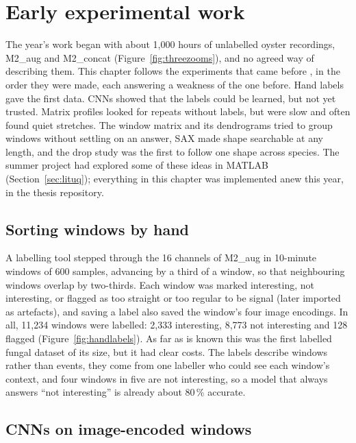\chapter{Early experimental work}
\label{ch:early}

The year's work began with about 1,000 hours of unlabelled oyster recordings, M2\_aug and M2\_concat (Figure~\ref{fig:threezooms}), and no agreed way of describing them. This chapter follows the experiments that came before \tool{}, in the order they were made, each answering a weakness of the one before. Hand labels gave the first data. CNNs showed that the labels could be learned, but not yet trusted. Matrix profiles looked for repeats without labels, but were slow and often found quiet stretches. The window matrix and its dendrograms tried to group windows without settling on an answer, SAX made shape searchable at any length, and the drop study was the first to follow one shape across species. The summer project had explored some of these ideas in MATLAB (Section~\ref{sec:lituq}); everything in this chapter was implemented anew this year, in the thesis repository.

\section{Sorting windows by hand}
\label{sec:handlabels}

A labelling tool stepped through the 16 channels of M2\_aug in 10-minute windows of 600 samples, advancing by a third of a window, so that neighbouring windows overlap by two-thirds. Each window was marked interesting, not interesting, or flagged as too straight or too regular to be signal (later imported as artefacts), and saving a label also saved the window's four image encodings. In all, 11,234 windows were labelled: 2,333 interesting, 8,773 not interesting and 128 flagged (Figure~\ref{fig:handlabels}). As far as is known this was the first labelled fungal dataset of its size, but it had clear costs. The labels describe windows rather than events, they come from one labeller who could see each window's context, and four windows in five are not interesting, so a model that always answers ``not interesting'' is already about 80\,\% accurate.

\section{CNNs on image-encoded windows}
\label{sec:earlycnn}

